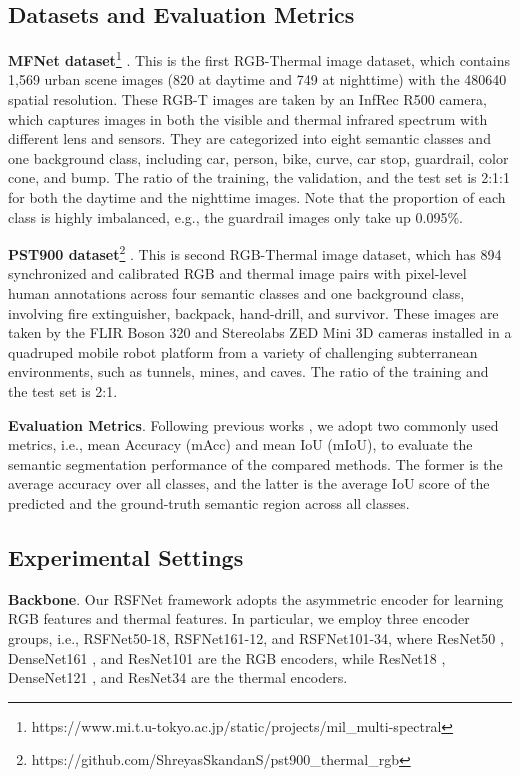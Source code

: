 \documentclass[10.5pt,twocolumn,journal,letterpaper]{IEEEtran}
\newcommand{\eg}{e.g.}
\newcommand{\ie}{i.e.}
\begin{document}
\subsection{Datasets and Evaluation Metrics}
\textbf{MFNet dataset}\footnote{https://www.mi.t.u-tokyo.ac.jp/static/projects/mil\_multi-spectral} \cite{ha-iros2017-mfnet}. This is the first RGB-Thermal image dataset, which contains 1,569 urban scene images (820 at daytime and 749 at nighttime) with the 480640 spatial resolution. These RGB-T images are taken by an InfRec R500 camera, which captures images in both the visible and thermal infrared spectrum with different lens and sensors. They are categorized into eight semantic classes and one background class, including car, person, bike, curve, car stop, guardrail, color cone, and bump. The ratio of the training, the validation, and the test set is 2:1:1 for both the daytime and the nighttime images. Note that the proportion of each class is highly imbalanced, \eg, the guardrail images only take up 0.095\%.

\textbf{PST900 dataset}\footnote{https://github.com/ShreyasSkandanS/pst900\_thermal\_rgb} \cite{shivakumar-icra2020-pst900}. This is second RGB-Thermal image dataset, which has 894 synchronized and calibrated RGB and thermal image pairs with pixel-level human annotations across four semantic classes and one background class, involving fire extinguisher, backpack, hand-drill, and survivor. These images are taken by the FLIR Boson 320 and Stereolabs ZED Mini 3D cameras installed in a quadruped mobile robot platform from a variety of challenging subterranean environments, such as tunnels, mines, and caves. The ratio of the training and the test set is 2:1.

\textbf{Evaluation Metrics}. Following previous works \cite{shivakumar-icra2020-pst900}, we adopt two commonly used metrics, \ie, mean Accuracy (mAcc) and mean IoU (mIoU), to evaluate the semantic segmentation performance of the compared methods. The former is the average accuracy over all classes, and the latter is the average IoU score of the predicted and the ground-truth semantic region across all classes.

\subsection{Experimental Settings}
\textbf{Backbone}. Our RSFNet framework adopts the asymmetric encoder for learning RGB features and thermal features. In particular, we employ three encoder groups, \ie, RSFNet50-18, RSFNet161-12, and RSFNet101-34, where ResNet50 \cite{he-cvpr2016-resnet}, DenseNet161 \cite{huang-cvpr2017-densenet}, and ResNet101 \cite{he-cvpr2016-resnet} are the RGB encoders, while ResNet18 \cite{he-cvpr2016-resnet}, DenseNet121 \cite{huang-cvpr2017-densenet}, and ResNet34 \cite{he-cvpr2016-resnet} are the thermal encoders. 
\end{document}
